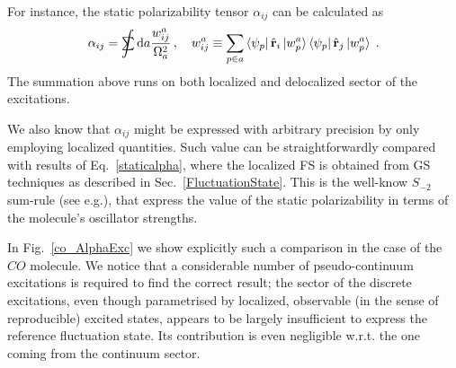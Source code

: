 \documentclass[reprint,aps,prb]{revtex4-1}
\newcommand{\dd}{{\rm d}}
\newcommand{\sint}{\mathrlap{\displaystyle\int}
\mathrlap{\textstyle\sum}
\phantom{\mathrlap{\displaystyle
\int}\textstyle\sum}}
\newcommand{\be}{\begin{equation}}
\newcommand{\ee}{\end{equation}}
\newcommand{\lb}{\label}
\newcommand{\op}[1]{\hat {#1}}
\newcommand{\fscd}[1]{\mathrm{Im}\ket{f_p^{\mathbf r_j}(\omega)^{#1}}}
\begin{document}
For instance, the static polarizability tensor $\alpha_{ij}$ can be calculated as
\be\lb{sminus2}
\alpha_{ij} = \sint \dd a \frac{w^a_{ij}}{\Omega_a^2}\,, \quad w^a_{ij} \equiv \sum_{p\in a} \bra{\psi_p} \op {\mathbf r}_i \ket{w_p^a}\bra{\psi_p} \op {\mathbf r}_j \ket{w_p^a}\;.
\ee
The summation above runs on both localized and delocalized sector of the excitations.

We also know that $\alpha_{ij}$ might be expressed with arbitrary precision by only employing localized quantities.
Such value can be straightforwardly compared with results of Eq.~\eqref{staticalpha}, where the localized FS is obtained from GS techniques as
described in Sec.~\ref{FluctuationState}.
This is the well-know $S_{-2}$ sum-rule (see e.g.\cite{Wagner2012}), that express the value of the static polarizability
in terms of the molecule's oscillator strengths.

In Fig.~\ref{co_AlphaExc} we show explicitly such a comparison in the case of the $CO$ molecule.
We notice that a considerable number of pseudo-continuum excitations is required
to find the correct result; the sector of the discrete excitations, even though
parametrised by localized, observable (in the sense of reproducible) excited states,
appears to be largely insufficient to express the reference fluctuation state. Its contribution is even negligible w.r.t.
the one coming from the continuum sector.
\end{document}
